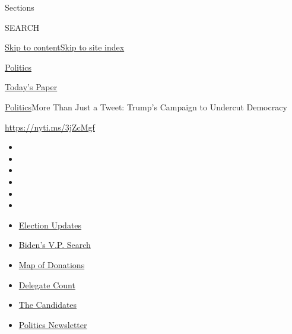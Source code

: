 Sections

SEARCH

\protect\hyperlink{site-content}{Skip to
content}\protect\hyperlink{site-index}{Skip to site index}

\href{https://www.nytimes.com/section/politics}{Politics}

\href{https://myaccount.nytimes.com/auth/login?response_type=cookie\&client_id=vi}{}

\href{https://www.nytimes.com/section/todayspaper}{Today's Paper}

\href{/section/politics}{Politics}\textbar{}More Than Just a Tweet:
Trump's Campaign to Undercut Democracy

\url{https://nyti.ms/3jZcMgf}

\begin{itemize}
\item
\item
\item
\item
\item
\item
\end{itemize}

\begin{itemize}
\item
  \href{https://www.nytimes.com/2020/08/03/us/elections/biden-vs-trump.html?action=click\&pgtype=Article\&state=default\&region=TOP_BANNER\&context=storylines_menu}{Election
  Updates}
\item
  \href{https://www.nytimes.com/article/biden-vice-president-2020.html?action=click\&pgtype=Article\&state=default\&region=TOP_BANNER\&context=storylines_menu}{Biden's
  V.P. Search}
\item
  \href{https://www.nytimes.com/interactive/2020/07/24/us/politics/trump-biden-campaign-donors.html?action=click\&pgtype=Article\&state=default\&region=TOP_BANNER\&context=storylines_menu}{Map
  of Donations}
\item
  \href{https://www.nytimes.com/interactive/2020/us/elections/delegate-count-primary-results.html?action=click\&pgtype=Article\&state=default\&region=TOP_BANNER\&context=storylines_menu}{Delegate
  Count}
\item
  \href{https://www.nytimes.com/interactive/2019/us/politics/2020-presidential-candidates.html?action=click\&pgtype=Article\&state=default\&region=TOP_BANNER\&context=storylines_menu}{The
  Candidates}
\item
  \href{https://www.nytimes.com/newsletters/politics?action=click\&pgtype=Article\&state=default\&region=TOP_BANNER\&context=storylines_menu}{Politics
  Newsletter}
\end{itemize}

